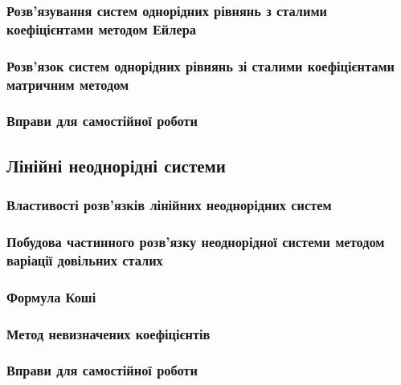 		\subsubsection{Розв'язування систем однорідних рівнянь з сталими коефіцієнтами методом Ейлера}
		

		\subsubsection{Розв'язок систем однорідних рівнянь зі сталими коефіцієнтами матричним методом}
		

		\subsubsection{Вправи для самостійної роботи \todo}
		

	\subsection{Лінійні неоднорідні системи \todo}
	

		\subsubsection{Властивості розв'язків лінійних неоднорідних систем \todo}
		

		\subsubsection{Побудова частинного розв'язку неоднорідної системи методом варіації довільних сталих \todo}
		

		\subsubsection{Формула Коші \todo}
		

		\subsubsection{Метод невизначених коефіцієнтів \todo}
		

		\subsubsection{Вправи для самостійної роботи \todo}
		

\newpage

\nocite{*}





